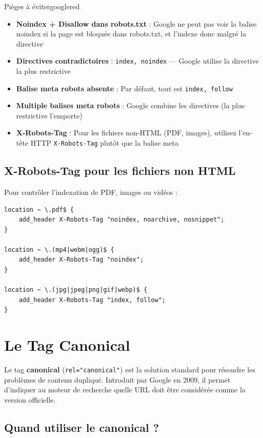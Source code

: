 \documentclass[12pt,a4paper,twoside]{report}
\newcommand{\keyword}[1]{\textbf{\textcolor{googleblue}{#1}}}
\newcommand{\important}[1]{\textbf{\textcolor{googlered}{#1}}}
\begin{document}
\begin{mybox}{Pièges à éviter}{googlered}
\begin{itemize}
    \item \important{Noindex + Disallow dans robots.txt} : Google ne peut pas voir la balise noindex si la page est bloquée dans robots.txt, et l'indexe donc malgré la directive
    \item \important{Directives contradictoires} : \texttt{index, noindex} — Google utilise la directive la plus restrictive
    \item \important{Balise meta robots absente} : Par défaut, tout est \texttt{index, follow}
    \item \important{Multiple balises meta robots} : Google combine les directives (la plus restrictive l'emporte)
    \item \important{X-Robots-Tag} : Pour les fichiers non-HTML (PDF, images), utilisez l'en-tête HTTP \texttt{X-Robots-Tag} plutôt que la balise meta
\end{itemize}
\end{mybox}

\subsection{X-Robots-Tag pour les fichiers non HTML}

Pour contrôler l'indexation de PDF, images ou vidéos :

\begin{lstlisting}[style=code,caption={En-tête HTTP X-Robots-Tag pour les fichiers PDF}]
location ~ \.pdf$ {
    add_header X-Robots-Tag "noindex, noarchive, nosnippet";
}

location ~ \.(mp4|webm|ogg)$ {
    add_header X-Robots-Tag "noindex";
}

location ~ \.(jpg|jpeg|png|gif|webp)$ {
    add_header X-Robots-Tag "index, follow";
}
\end{lstlisting}

\section{Le Tag Canonical}

Le tag \keyword{canonical} (\texttt{rel="canonical"}) est la solution standard pour résoudre les problèmes de contenu dupliqué. Introduit par Google en 2009, il permet d'indiquer au moteur de recherche quelle URL doit être considérée comme la version officielle.

\subsection{Quand utiliser le canonical ?}
\end{document}
